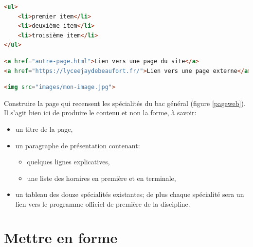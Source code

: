 \documentclass[a4paper,11pt]{article}
\begin{document}
\begin{Form}
\begin{center}
\begin{lstlisting}[language=html]
<ul>
	<li>premier item</li>
	<li>deuxième item</li>
	<li>troisième item</li>
</ul>
\end{lstlisting} 
\label{moncode}
\end{center}

\begin{center}
\begin{lstlisting}[language=html]
<a href="autre-page.html">Lien vers une page du site</a>
<a href="https://lyceejaydebeaufort.fr/">Lien vers une page externe</a>
\end{lstlisting}
\label{moncode}
\end{center}

\begin{center}
\begin{lstlisting}[language=html]
<img src="images/mon-image.jpg">
\end{lstlisting}
\label{moncode}
\end{center}
\begin{activite}
Construire la page qui recensent les spécialités du bac général (figure \ref{pageweb}). Il s'agit bien ici de produire le contenu et non la forme, à savoir:
\begin{itemize}
\item un titre de la page,
\item un paragraphe de présentation contenant:
\begin{itemize}
\item quelques lignes explicatives,
\item une liste des horaires en première et en terminale,
\end{itemize}
\item un tableau des douze spécialités existantes; de plus chaque spécialité sera un lien vers le programme officiel de première de la discipline.
\end{itemize}
\end{activite}
\section{Mettre en forme}

\end{Form}
\end{document}
